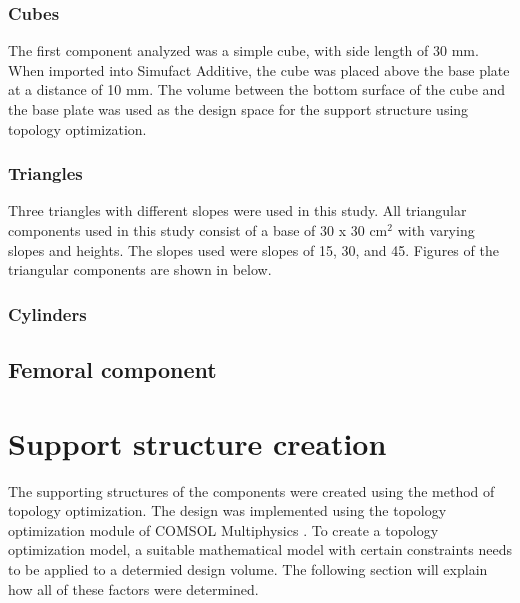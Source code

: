 \documentclass[../main.tex]{subfiles}
\begin{document}
\subsubsection{Cubes}

The first component analyzed was a simple cube, with side length of 30 mm. When imported into Simufact Additive, the cube was placed above the base plate at a distance of 10 mm. The volume between the bottom surface of the cube and the base plate was used as the design space for the support structure using topology optimization.


\subsubsection{Triangles}

Three triangles with different slopes were used in this study. All triangular components used in this study consist of a base of 30 x 30 cm$^{2}$ with varying slopes and heights. The slopes used were slopes of 15\degree, 30\degree, and 45\degree. Figures of the triangular components are shown in  below.


\subsubsection{Cylinders}

\subsection{Femoral component}


\section{Support structure creation}

The supporting structures of the components were created using the method of topology optimization. The design was implemented using the topology optimization module of COMSOL Multiphysics . To create a topology optimization model, a suitable mathematical model with certain constraints needs to be applied to a determied design volume. The following section will explain how all of these factors were determined.
\end{document}
